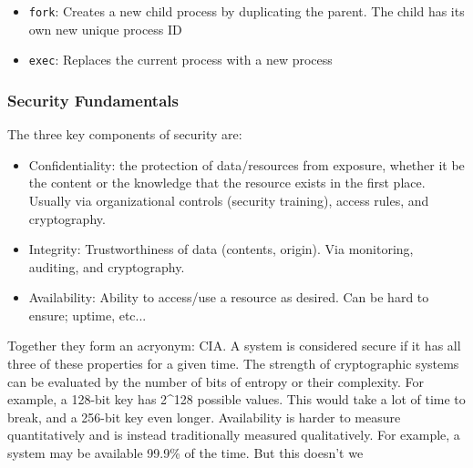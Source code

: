 \documentclass[../notes.tex]{subfiles}
\begin{document}
\begin{itemize}
    \item \texttt{fork}: Creates a new child process by duplicating the parent. The child has its own new unique process ID
    \item \texttt{exec}: Replaces the current process with a new process
\end{itemize}



\subsubsection{Security Fundamentals}

The three key components of security are:

\begin{itemize}
    \item Confidentiality: the protection of data/resources from exposure, whether it be the content or the knowledge that the resource exists in the first place. Usually via organizational controls (security training), access rules, and cryptography.
    \item Integrity: Trustworthiness of data (contents, origin). Via monitoring, auditing, and cryptography.
    \item Availability: Ability to access/use a resource as desired. Can be hard to ensure; uptime, etc...
\end{itemize}

Together they form an acryonym: CIA. A system is considered secure if it has all three of these properties for a given time.
The strength of cryptographic systems can be evaluated by the number of bits of entropy or their complexity. For example, a 128-bit key has 2^128 possible values. This would take a lot of time to break, and a 256-bit key even longer.
Availability is harder to measure quantitatively and is instead traditionally measured qualitatively. For example, a system may be available 99.9\% of the time. But this doesn't we
\end{document}
